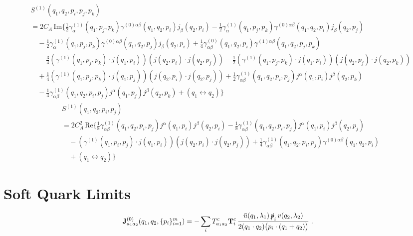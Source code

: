 \documentclass[a4paper,11pt]{article}
\begin{document}
\begin{equation}
\begin{split}
&S^{(1)}(q_1, q_2, p_i, p_j, p_k) \\
&= 2 C_A \, \text{Im} \bigg \lbrace \frac{1}{2} \gamma^{(1)}_{\alpha}(q_1, p_j, p_k) \gamma^{(0)\alpha \beta}(q_1, q_2, p_i) j_\beta(q_2, p_i)  -  \frac{1}{2} \gamma^{(1)}_{\alpha}(q_1, p_j, p_k) \gamma^{(0)\alpha \beta}(q_1, q_2, p_i) j_\beta(q_2, p_j)  \\
& \quad -  \frac{1}{2} \gamma^{(1)}_{\alpha}(q_1, p_j, p_k) \gamma^{(0)\alpha \beta}(q_1, q_2, p_j) j_\beta(q_2, p_i) + \frac{1}{4} \gamma^{(0)}_{\alpha \beta} (q_1, q_2, p_i) \gamma^{(1)\alpha \beta}(q_1, q_2, p_j, p_k) \\
& \quad - \frac{3}{4} \left(\gamma^{(1)}(q_1, p_j, p_k) \cdot j(q_1, p_i) \right) \left(j(q_2, p_i) \cdot j(q_2, p_j) \right) - \frac{1}{2} \left(\gamma^{(1)}(q_1, p_j, p_k) \cdot j(q_1, p_i) \right) \left(j(q_2, p_j) \cdot j(q_2, p_k) \right) \\
& \quad + \frac{1}{4} \left(\gamma^{(1)}(q_1, p_j, p_k) \cdot j(q_1, p_j) \right) \left(j(q_2, p_i) \cdot j(q_2, p_j) \right) + \frac{1}{2} \gamma^{(1)}_{\alpha \beta}(q_1, q_2, p_i, p_j) j^\alpha(q_1, p_i) j^\beta(q_2, p_k) \\
& \quad - \frac{1}{4} \gamma^{(1)}_{\alpha \beta}(q_1, q_2, p_i, p_j) j^\alpha(q_1, p_j) j^\beta(q_2, p_k) + (q_1 \longleftrightarrow q_2) \bigg \rbrace
\end{split}
\end{equation}
%
\begin{equation}
\begin{split}
&S^{(1)}(q_1, q_2, p_i, p_j) \\
&= 2 C_A^2\, \text{Re} \bigg \lbrace \frac{1}{8} \gamma^{(1)}_{\alpha \beta} (q_1, q_2, p_i, p_j) j^\alpha (q_1, p_i) j^\beta(q_2, p_i) - \frac{1}{8} \gamma^{(1)}_{\alpha \beta} (q_1, q_2, p_i, p_j) j^\alpha (q_1, p_i) j^\beta(q_2, p_j) \\
& \quad - \left( \gamma^{(1)}(q_1, p_i, p_j) \cdot j(q_1, p_i) \right) \left(j(q_2, p_i) \cdot j(q_2, p_j) \right) + \frac{1}{4} \gamma^{(1)}_{\alpha \beta}(q_1, q_2, p_i, p_j) \gamma^{(0)\alpha \beta}(q_1, q_2, p_i) \\
& \quad + (q_1 \longleftrightarrow q_2 ) \bigg \rbrace
\end{split}
\end{equation} 

\section{Soft Quark Limits}
\begin{equation} \label{eq:J0quarks}
    \mathbf{J}^{(0)}_{a_1 a_2}(q_1, q_2, \{ p_i \}_{i=1}^m ) = - \sum_{i} T^c_{a_1a_2} \mathbf{T}^c_i \, \frac{\bar{u}(q_1,\lambda_1) \, \slashed{p}_i \, v(q_2,\lambda_2)}{2 ( q_1 \cdot q_2 ) \big( p_i \cdot (q_1  + q_2) \big)} \; .
\end{equation}
\end{document}
